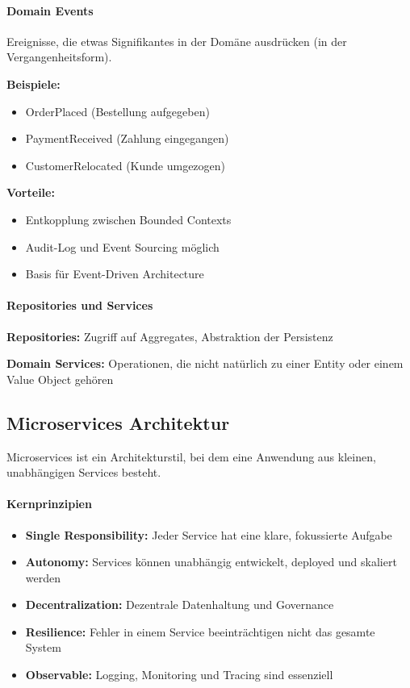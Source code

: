 \paragraph{Domain Events}
Ereignisse, die etwas Signifikantes in der Domäne ausdrücken (in der Vergangenheitsform).

\textbf{Beispiele:}
\begin{itemize}
\item OrderPlaced (Bestellung aufgegeben)
\item PaymentReceived (Zahlung eingegangen)
\item CustomerRelocated (Kunde umgezogen)
\end{itemize}

\textbf{Vorteile:}
\begin{itemize}
\item Entkopplung zwischen Bounded Contexts
\item Audit-Log und Event Sourcing möglich
\item Basis für Event-Driven Architecture
\end{itemize}

\paragraph{Repositories und Services}
\textbf{Repositories:} Zugriff auf Aggregates, Abstraktion der Persistenz

\textbf{Domain Services:} Operationen, die nicht natürlich zu einer Entity oder einem Value Object gehören

\subsection{Microservices Architektur}
\label{subsec:microservices}

Microservices ist ein Architekturstil, bei dem eine Anwendung aus kleinen, unabhängigen Services besteht.

\paragraph{Kernprinzipien}
\begin{itemize}
\item \textbf{Single Responsibility:} Jeder Service hat eine klare, fokussierte Aufgabe
\item \textbf{Autonomy:} Services können unabhängig entwickelt, deployed und skaliert werden
\item \textbf{Decentralization:} Dezentrale Datenhaltung und Governance
\item \textbf{Resilience:} Fehler in einem Service beeinträchtigen nicht das gesamte System
\item \textbf{Observable:} Logging, Monitoring und Tracing sind essenziell
\end{itemize}

